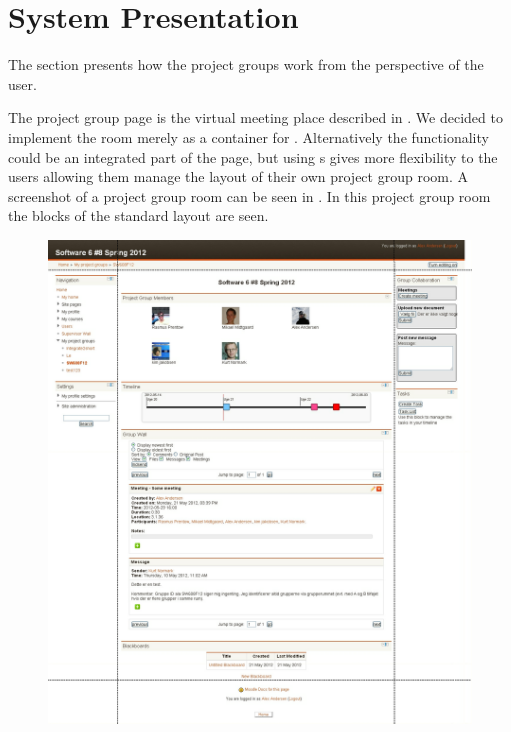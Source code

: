 \chapter{System Presentation}
\label{sub:page}
The section presents how the project groups work from the perspective of the user. 

The project group page is the virtual meeting place described in .
We decided to implement the room merely as a container for \block{}.
Alternatively the functionality could be an integrated part of the page, but using \block s gives more flexibility to the users allowing them manage the layout of their own project group room. 
A screenshot of a project group room can be seen in . 
In this project group room the blocks of the standard layout are seen.
\begin{figure}[h]
	\centering
		\includegraphics[width=\textwidth]{images/projectgroupnoedit.png}
	\label{fig:projectgroupnoedit}
\end{figure}

